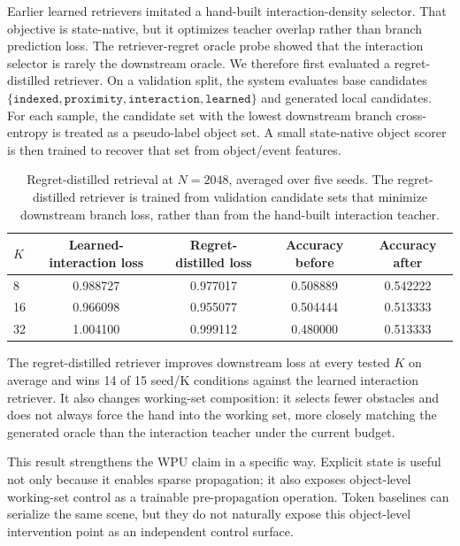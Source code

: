 \documentclass[11pt]{article}
\begin{document}
Earlier learned retrievers imitated a hand-built interaction-density selector.
That objective is state-native, but it optimizes teacher overlap rather than
branch prediction loss. The retriever-regret oracle probe showed that the
interaction selector is rarely the downstream oracle. We therefore first
evaluated a regret-distilled retriever. On a validation split, the system evaluates base
candidates \(\{\texttt{indexed}, \texttt{proximity}, \texttt{interaction},
\texttt{learned}\}\) and generated local candidates. For each sample, the
candidate set with the lowest downstream branch cross-entropy is treated as a
pseudo-label object set. A small state-native object scorer is then trained to
recover that set from object/event features.

\begin{table}[t]
\centering
\begin{tabular}{lcccc}
\toprule
\(K\) & Learned-interaction loss & Regret-distilled loss & Accuracy before & Accuracy after \\
\midrule
8 & 0.988727 & 0.977017 & 0.508889 & 0.542222 \\
16 & 0.966098 & 0.955077 & 0.504444 & 0.513333 \\
32 & 1.004100 & 0.999112 & 0.480000 & 0.513333 \\
\bottomrule
\end{tabular}
\caption{Regret-distilled retrieval at \(N=2048\), averaged over five seeds.
The regret-distilled retriever is trained from validation candidate sets that
minimize downstream branch loss, rather than from the hand-built interaction
teacher.}
\label{tab:regret-distillation}
\end{table}

The regret-distilled retriever improves downstream loss at every tested \(K\)
on average and wins 14 of 15 seed/K conditions against the learned interaction
retriever. It also changes working-set composition: it selects fewer obstacles
and does not always force the hand into the working set, more closely matching
the generated oracle than the interaction teacher under the current budget.

This result strengthens the WPU claim in a specific way. Explicit state is
useful not only because it enables sparse propagation; it also exposes
object-level working-set control as a trainable pre-propagation operation.
Token baselines can serialize the same scene, but they do not naturally expose
this object-level intervention point as an independent control surface.
\end{document}
